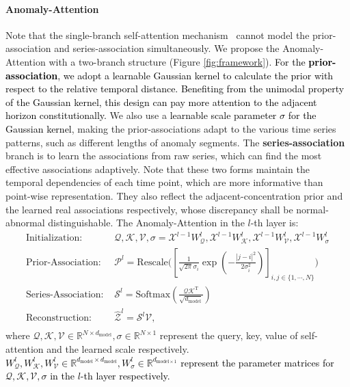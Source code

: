 \documentclass{article} %
\newcommand{\update}[1]{{\textcolor{black}{#1}}}
\begin{document}
\vspace{-5pt}
\paragraph{Anomaly-Attention} Note that the single-branch self-attention mechanism~\citep{NIPS2017_3f5ee243} cannot model the prior-association and series-association simultaneously. We propose the Anomaly-Attention with a two-branch structure (Figure \ref{fig:framework}). \update{For the \textbf{prior-association}, we adopt a learnable Gaussian kernel to calculate the prior with respect to the relative temporal distance. Benefiting from the unimodal property of the Gaussian kernel, this design can pay more attention to the adjacent horizon constitutionally.} We also use a \update{learnable scale parameter $\sigma$ for the Gaussian kernel}, making the prior-associations adapt to the various time series patterns, such as different lengths of anomaly segments. The \textbf{series-association} branch is to learn the associations from raw series, which can find the most effective associations adaptively. Note that these two forms maintain the temporal dependencies of each time point, which are more informative than point-wise representation. They also reflect the adjacent-concentration prior and the learned real associations respectively, whose discrepancy shall be normal-abnormal distinguishable. The Anomaly-Attention in the $l$-th layer is:
\begin{equation}\label{equ:attention}
  \begin{split}
  \text{Initialization:\ }& \mathcal{Q},\mathcal{K},\mathcal{V},\sigma=\mathcal{X}^{l-1}W_{\mathcal{Q}}^{l},\mathcal{X}^{l-1}W_{\mathcal{K}}^{l},\mathcal{X}^{l-1}W_{\mathcal{V}}^{l},\mathcal{X}^{l-1}W_{\sigma}^{l} \\
  \text{Prior-Association:\ }&\mathcal{P}^{l} = \mathrm{Rescale}\Bigg(\left[\frac{1}{\sqrt{2\pi}\sigma_i}\exp\left(-\frac{|j-i|^2}{2\sigma_i^2}\right)\right]_{i,j\in\{1,\cdots,N\}}\Bigg) \\
  \text{Series-Association:\ }&\mathcal{S}^{l} = \mathrm{Softmax}\left(\frac{\mathcal{Q}\mathcal{K}^{\text{T}}}{\sqrt{d_{\text{model}}}}\right) \\
  \text{Reconstruction:\ }&{\widehat{\mathcal{Z}}}^{l} = \mathcal{S}^{l}\mathcal{V}, \\
  \end{split}
\end{equation}
where $\mathcal{Q},\mathcal{K},\mathcal{V}\in\mathbb{R}^{N\times d_{\text{model}}},\sigma\in\mathbb{R}^{N\times 1}$ represent the query, key, value of self-attention and the learned scale respectively. \update{$W_{\mathcal{Q}}^{l},W_{\mathcal{K}}^{l},W_{\mathcal{V}}^{l}\in\mathbb{R}^{d_{\text{model}}\times d_{\text{model}}}, W_{\sigma}^{l}\in\mathbb{R}^{d_{\text{model}\times 1}}$ represent the parameter matrices for $\mathcal{Q},\mathcal{K},\mathcal{V},\sigma$ in the $l$-th layer respectively.}
\end{document}
